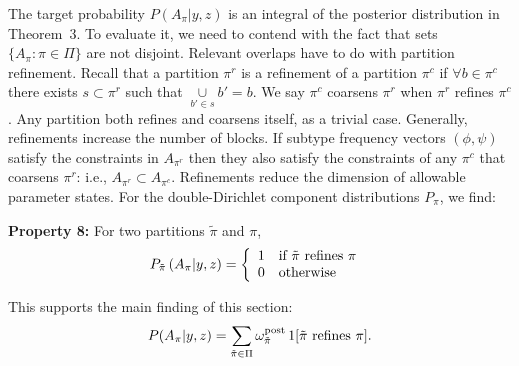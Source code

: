 \documentclass[aoas,preprint]{imsart}
\begin{document}
The target probability $P(A_\pi|y,z)$ is an integral of the posterior distribution in Theorem~3.
To evaluate it, we need to contend with the fact that sets $\{ A_\pi: \pi \in \Pi \}$ are not disjoint.
Relevant overlaps have to do with partition refinement.  Recall 
that a  partition $\pi^r$ is a refinement of a partition $\pi^c$ if $\forall b \in \pi^c$ there 
exists $s \subset \pi^r$  such that $\underset{b'\in s}\cup b' = b$. 
We say $\pi^c$  coarsens $\pi^r$ when $\pi^r$ refines $\pi^c$. Any partition both
refines and coarsens itself, as a trivial case. 
Generally, refinements increase the number of blocks.
 If subtype frequency vectors $(\phi,\psi)$
satisfy the constraints in $A_{\pi^r}$ then they also satisfy the constraints of any $\pi^c$
that coarsens $\pi^r$: i.e., $A_{\pi^r} \subset A_{\pi^c}$.  
Refinements reduce the dimension of allowable parameter states. 
 For the double-Dirichlet
component distributions $P_\pi$, we find:

\noindent
{\bf Property 8:} For two partitions $\tilde \pi$ and $\pi$,  
\begin{eqnarray*}
P_{\tilde \pi}\left( A_{\pi} | y,z \right) = \left\{  \begin{array}{ll}
     1  & {\mbox {\rm if $\tilde \pi$ refines $\pi$ }} \\ 
     0  & {\mbox {\rm otherwise }} \\ 
                                                   \end{array}
   \right.
\end{eqnarray*}


This supports the main finding of this section:
\begin{eqnarray}
P(A_\pi|y,z) = 
\sum_{\tilde \pi \in \Pi} \omega^{\rm post}_{\tilde \pi} \,  1[ {\mbox {\rm $\tilde \pi$ refines $\pi$}} ].
\end{eqnarray}



\end{document}
